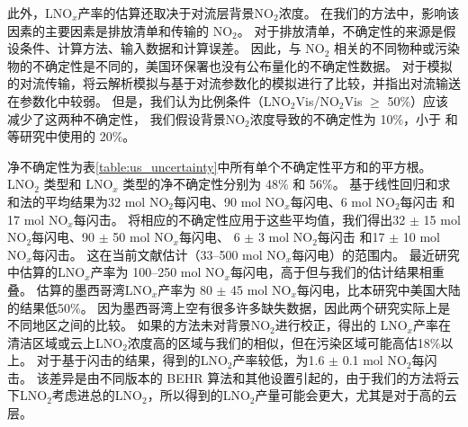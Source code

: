 此外，LNO$_x$产率的估算还取决于对流层背景NO$_2$浓度。
在我们的方法中，影响该因素的主要因素是排放清单和传输的 NO$_2$。
对于排放清单，不确定性的来源是假设条件、计算方法、输入数据和计算误差。
因此，与 NO$_2$ 相关的不同物种或污染物的不确定性是不同的，美国环保署也没有公布量化的不确定性数据。
对于模拟的对流传输，\citet{Li.2018}将云解析模拟与基于对流参数化的模拟进行了比较，并指出对流输送在参数化中较弱。
但是，我们认为比例条件（LNO$_2$Vis/NO$_2$Vis $\geq$ 50\%）应该减少了这两种不确定性，
我们假设背景NO$_2$浓度导致的不确定性为 10\%，小于 \citet{Allen.2019}和\citet{Bucsela.2019}等研究中使用的 20\%。

净不确定性为表\ref{table:us_uncertainty}中所有单个不确定性平方和的平方根。
LNO$_2$ 类型和 LNO$_x$ 类型的净不确定性分别为 48\% 和 56\%。
基于线性回归和求和法的平均结果为32 mol NO$_2$每闪电、90 mol NO$_x$每闪电、6 mol NO$_2$每闪击 和 17 mol NO$_x$每闪击。
将相应的不确定性应用于这些平均值，我们得出32 $\pm$ 15 mol NO$_2$每闪电、90 $\pm$ 50 mol NO$_x$每闪电、
6 $\pm$ 3 mol NO$_2$每闪击 和17 $\pm$ 10 mol NO$_x$每闪击。
这在当前文献估计（33--500 mol NO$_x$每闪电）的范围内\citep{Schumann.2007,Beirle.2010,Bucsela.2010}。
最近\citet{Bucsela.2010}研究中估算的LNO$_x$产率为 100--250 mol NO$_x$每闪电，高于但与我们的估计结果相重叠。
\citet{Pickering.2016}估算的墨西哥湾LNO$_x$产率为 80 $\pm$ 45 mol NO$_x$每闪电，比本研究中美国大陆的结果低50\%。
因为墨西哥湾上空有很多许多缺失数据，因此两个研究实际上是不同地区之间的比较。
如果\citet{Pickering.2016}的方法未对背景NO$_2$进行校正，得出的 LNO$_x$产率在清洁区域或云上LNO$_2$浓度高的区域与我们的相似，但在污染区域可能高估18\%以上。
对于基于闪击的结果，\citet{Lapierre.2020}得到的LNO$_2$产率较低，为1.6 $\pm$ 0.1 mol NO$_2$每闪击。
该差异是由不同版本的 BEHR 算法和其他设置引起的，由于我们的方法将云下LNO$_2$考虑进总的LNO$_2$，所以得到的LNO$_2$产量可能会更大，尤其是对于高的云层。



